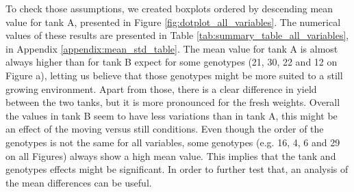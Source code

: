 To check those assumptions, we created boxplots ordered by descending mean value for tank A, presented in Figure \ref{fig:dotplot_all_variables}. The numerical values of these results are presented in Table \ref{tab:summary_table_all_variables}, in Appendix \ref{appendix:mean_std_table}.
The mean value for tank A is almost always higher than for tank B expect for some genotypes (21, 30, 22 and 12 on Figure a), letting us believe that those genotypes might be more suited to a still growing environment. Apart from those, there is a clear difference in yield between the two tanks, but it is more pronounced for the fresh weights. Overall the values in tank B seem to have less variations than in tank A, this might be an effect of the moving versus still conditions. Even though the order of the genotypes is not the same for all variables, some genotypes (e.g. 16, 4, 6 and 29 on all Figures) always show a high mean value.
This implies that the tank and genotypes effects might be significant. In order to further test that, an analysis of the mean differences can be useful. 


